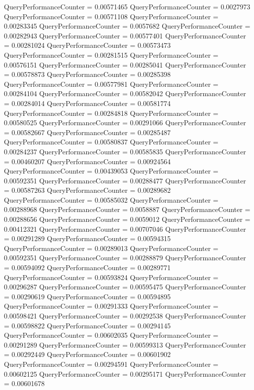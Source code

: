 \documentclass[9pt]{article}
\theoremstyle{plain}
\theoremstyle{definition}
\theoremstyle{remark}
\numberwithin{equation}{section}
\begin{document}
QueryPerformanceCounter  =  0.00571465
QueryPerformanceCounter  =  0.0027973
QueryPerformanceCounter  =  0.00571108
QueryPerformanceCounter  =  0.00283345
QueryPerformanceCounter  =  0.0057682
QueryPerformanceCounter  =  0.00282943
QueryPerformanceCounter  =  0.00577401
QueryPerformanceCounter  =  0.00281024
QueryPerformanceCounter  =  0.00573473
QueryPerformanceCounter  =  0.00281515
QueryPerformanceCounter  =  0.00576151
QueryPerformanceCounter  =  0.00285041
QueryPerformanceCounter  =  0.00578873
QueryPerformanceCounter  =  0.00285398
QueryPerformanceCounter  =  0.00577981
QueryPerformanceCounter  =  0.00284104
QueryPerformanceCounter  =  0.00582042
QueryPerformanceCounter  =  0.00284014
QueryPerformanceCounter  =  0.00581774
QueryPerformanceCounter  =  0.00284818
QueryPerformanceCounter  =  0.00580525
QueryPerformanceCounter  =  0.00291066
QueryPerformanceCounter  =  0.00582667
QueryPerformanceCounter  =  0.00285487
QueryPerformanceCounter  =  0.00580837
QueryPerformanceCounter  =  0.00284237
QueryPerformanceCounter  =  0.00585835
QueryPerformanceCounter  =  0.00460207
QueryPerformanceCounter  =  0.00924564
QueryPerformanceCounter  =  0.00439053
QueryPerformanceCounter  =  0.00592351
QueryPerformanceCounter  =  0.00288477
QueryPerformanceCounter  =  0.00587263
QueryPerformanceCounter  =  0.00289682
QueryPerformanceCounter  =  0.00585032
QueryPerformanceCounter  =  0.00288968
QueryPerformanceCounter  =  0.0058887
QueryPerformanceCounter  =  0.00288656
QueryPerformanceCounter  =  0.0059012
QueryPerformanceCounter  =  0.00412321
QueryPerformanceCounter  =  0.00707046
QueryPerformanceCounter  =  0.00291289
QueryPerformanceCounter  =  0.00594315
QueryPerformanceCounter  =  0.00289013
QueryPerformanceCounter  =  0.00592351
QueryPerformanceCounter  =  0.00288879
QueryPerformanceCounter  =  0.00594092
QueryPerformanceCounter  =  0.00289771
QueryPerformanceCounter  =  0.00593824
QueryPerformanceCounter  =  0.00296287
QueryPerformanceCounter  =  0.00595475
QueryPerformanceCounter  =  0.00290619
QueryPerformanceCounter  =  0.00594895
QueryPerformanceCounter  =  0.00291333
QueryPerformanceCounter  =  0.00598421
QueryPerformanceCounter  =  0.00292538
QueryPerformanceCounter  =  0.00598822
QueryPerformanceCounter  =  0.00294145
QueryPerformanceCounter  =  0.00602035
QueryPerformanceCounter  =  0.00291289
QueryPerformanceCounter  =  0.00599313
QueryPerformanceCounter  =  0.00292449
QueryPerformanceCounter  =  0.00601902
QueryPerformanceCounter  =  0.00294591
QueryPerformanceCounter  =  0.00602125
QueryPerformanceCounter  =  0.00295171
QueryPerformanceCounter  =  0.00601678
\end{document}
